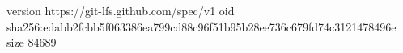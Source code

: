 version https://git-lfs.github.com/spec/v1
oid sha256:edabb2fcbb5f063386ea799cd88c96f51b95b28ee736c679fd74c3121478496e
size 84689
